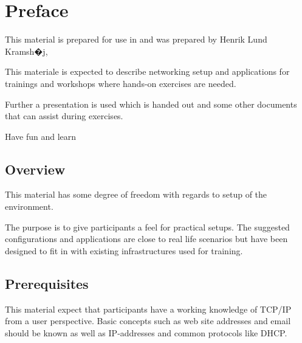\documentclass[a4paper,11pt,notitlepage]{report}
\begin{document}

\newcommand{\emne}[1]{hacker workshop}
\newcommand{\kursus}[1]{ethical hacker workshop}
\newcommand{\kursusnavn}[1]{ethical hacker workshop\\ exercises}





\setlength{\parskip}{0pt}

\setcounter{tocdepth}{0}

\normal

{\color{titlecolor}\tableofcontents}

\normal
\pagestyle{fancyplain}
\chapter*{\color{titlecolor}Preface}
This material is prepared for use in \emph{\kursus} and was prepared by
Henrik Lund Kramsh�j, 

This materiale is expected to describe networking setup and
applications for trainings and workshops where hands-on exercises are needed.

Further a presentation is used which is handed out and some other documents that can assist during exercises.

\vskip 1cm
Have fun and learn

\section*{\color{titlecolor}Overview}
\setlength{\parskip}{10pt}

This material has some degree of freedom with regards to setup of the environment.

The purpose is to give participants a feel for practical setups. The suggested configurations
and applications are close to real life scenarios but have been designed to fit in with existing infrastructures used for training.


\section*{\color{titlecolor}Prerequisites}

This material expect that participants have a working knowledge of
TCP/IP from a user perspective. Basic concepts such as web site addresses and email should be known as well as IP-addresses and common protocols like DHCP.
\end{document}
